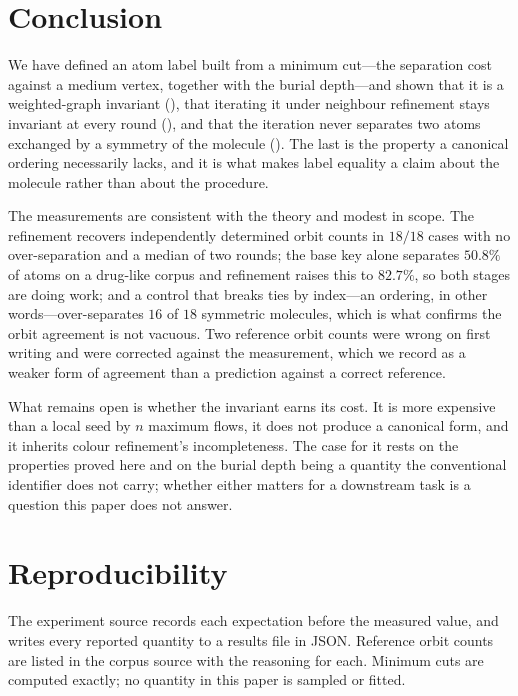 \documentclass[11pt,twocolumn,a4paper]{article}
\theoremstyle{crthm}
\theoremstyle{definition}
\theoremstyle{remark}
\begin{document}
\section{Conclusion}
\label{sec:conclusion}

We have defined an atom label built from a minimum cut---the separation
cost against a medium vertex, together with the burial depth---and shown
that it is a weighted-graph invariant (), that
iterating it under neighbour refinement stays invariant at every round
(), and that the iteration never separates two
atoms exchanged by a symmetry of the molecule ().
The last is the property a canonical ordering necessarily lacks, and it is
what makes label equality a claim about the molecule rather than about the
procedure.

The measurements are consistent with the theory and modest in scope. The
refinement recovers independently determined orbit counts in $18/18$
cases with no over-separation and a median of two rounds; the base key
alone separates $50.8\%$ of atoms on a drug-like corpus and refinement
raises this to $82.7\%$, so both stages are doing work; and a control
that breaks ties by index---an ordering, in other words---over-separates
$16$ of $18$ symmetric molecules, which is what confirms the orbit
agreement is not vacuous. Two reference orbit counts were wrong on first
writing and were corrected against the measurement, which we record as a
weaker form of agreement than a prediction against a correct reference.

What remains open is whether the invariant earns its cost. It is more
expensive than a local seed by $n$ maximum flows, it does not produce a
canonical form, and it inherits colour refinement's incompleteness. The
case for it rests on the properties proved here and on the burial depth
being a quantity the conventional identifier does not carry; whether
either matters for a downstream task is a question this paper does not
answer.

\section*{Reproducibility}

The experiment source records each expectation before the measured value,
and writes every reported quantity to a results file in JSON. Reference
orbit counts are listed in the corpus source with the reasoning for each.
Minimum cuts are computed exactly; no quantity in this paper is sampled or
fitted.



\end{document}
